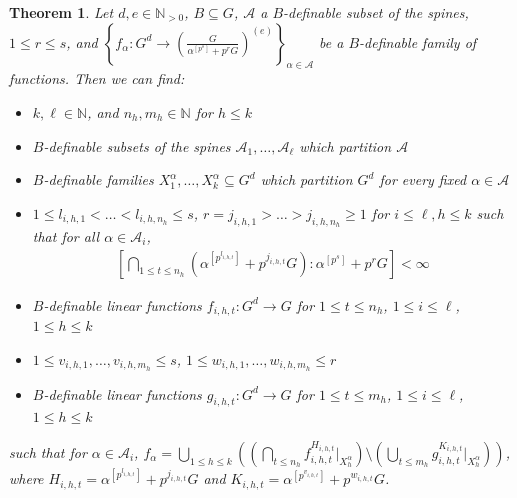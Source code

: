 \documentclass[a4paper,11pt]{article}
\newtheorem{theorem}{Theorem}[section]
\newtheorem{proposition}[theorem]{Proposition}
\newcommand{\acl}{\textrm{acl}}
\begin{document}
\begin{theorem}\label{main for a^p^s+p^rG}
	Let $d,e\in\mathbb{N}_{>0}$, $B\subseteq G$, $\mathcal{A}$ a $B$-definable subset of the spines, $1\leq r \leq s$, and $\left\{f_\alpha:G^d\rightarrow (\frac{G}{\alpha^{[p^s]}+p^rG})^{(e)}\right\}_{\alpha\in\mathcal{A}}$ be a $B$-definable family of functions. Then we can find:
	\begin{itemize}
        \item $k,\ell\in\mathbb{N}$, and $n_h, m_h\in \mathbb{N}$ for $h\leq k$
        \item $B$-definable subsets of the spines $\mathcal{A}_1,\dots,\mathcal{A}_\ell$  which partition $\mathcal{A}$
		\item $B$-definable families $X_1^\alpha,\dots,X_k^\alpha\subseteq G^d$ which partition $G^d$ for every fixed $\alpha\in\mathcal{A}$
		\item $1\leq l_{i,h,1} <\dots<l_{i,h,n_h}\leq s$, $r = j_{i,h,1}>\dots>j_{i,h,n_h}\geq 1$ for $i\leq\ell, h\leq k$ such that for all $\alpha\in\mathcal{A}_i$,
        \begin{align*}
            \left[\bigcap\limits_{1\leq t\leq n_h}(\alpha^{[p^{l_{i,h,t}}]}+p^{j_{i,h,t}}G):\alpha^{[p^s]}+p^rG\right]<\infty
        \end{align*}
		\item $B$-definable linear functions $f_{i,h,t}:G^d\rightarrow G$ for $1\leq t\leq n_h$, $1\leq i\leq\ell$, $1\leq h\leq k$
		\item $1\leq v_{i,h,1},\dots,v_{i,h,m_h}\leq s$, $1\leq w_{i,h,1},\dots,w_{i,h,m_h}\leq r$
		\item $B$-definable linear functions $g_{i,h,t}:G^d\rightarrow G$ for $1\leq t\leq m_h$, $1\leq i\leq\ell$, $1\leq h\leq k$
	\end{itemize} such that for $\alpha \in\mathcal{A}_i$, $f_\alpha = \bigcup\limits_{1\leq h\leq k} ((\bigcap\limits_{t\leq n_h}f_{i,h,t}^{H_{i,h,t}}|_{X_h^\alpha})\setminus(\bigcup\limits_{t\leq m_h}g_{i,h,t}^{K_{i,h,t}}|_{X_h^\alpha}))$, where $H_{i,h,t} = \alpha^{[p^{l_{i,h,t}}]}+p^{j_{i,h,t}}G$ and $K_{i,h,t} = \alpha^{[p^{v_{i,h,t}}]}+p^{w_{i,h,t}}G$. %
\end{theorem}
\end{document}
